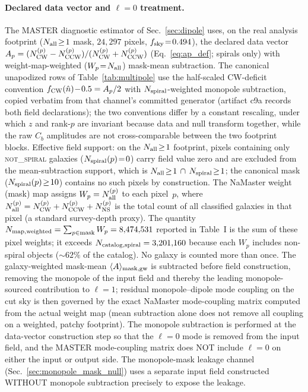 \documentclass[aps,prd,twocolumn,superscriptaddress,preprintnumbers,nofootinbib,longbibliography,floatfix]{revtex4-2}
\newcommand{\NS}{\textsc{not\_spiral}}
\begin{document}
\paragraph{Declared data vector and $\ell\!=\!0$ treatment.}
The MASTER diagnostic estimator of Sec.~\ref{sec:dipole} uses, on the real analysis footprint ($N_{\rm all}\!\geq\!1$ mask, $24{,}297$ pixels, $f_{\rm sky}\!=\!0.494$), the declared data vector $A_p = (N_{\rm CW}^{(p)} - N_{\rm CCW}^{(p)})/(N_{\rm CW}^{(p)} + N_{\rm CCW}^{(p)})$ (Eq.~\ref{eq:ap_def}; spirals only) with weight-map-weighted ($W_p\!=\!N_{\rm all}$) mask-mean subtraction. The canonical unapodized rows of Table~\ref{tab:multipole} use the half-scaled CW-deficit convention $f_{\rm CW}(\hat n)\!-\!0.5 = A_p/2$ with $N_{\rm spiral}$-weighted monopole subtraction, copied verbatim from that channel's committed generator (artifact c9a records both field declarations); the two conventions differ by a constant rescaling, under which $z$ and rank-$p$ are invariant because data and null transform together, while the raw $C_b$ amplitudes are not cross-comparable between the two footprint blocks. Effective field support: on the $N_{\rm all}\!\geq\!1$ footprint, pixels containing only \NS{} galaxies ($N_{\rm spiral}(p)\!=\!0$) carry field value zero and are excluded from the mean-subtraction support, which is $N_{\rm all}\!\geq\!1 \,\cap\, N_{\rm spiral}\!\geq\!1$; the canonical mask ($N_{\rm spiral}(p)\!\geq\!10$) contains no such pixels by construction. The NaMaster weight (mask) map assigns $W_p = N_{\rm all}^{(p)}$ to each pixel~$p$, where $N_{\rm all}^{(p)} = N_{\rm CW}^{(p)} + N_{\rm CCW}^{(p)} + N_{\rm NS}^{(p)}$ is the total count of all classified galaxies in that pixel (a standard survey-depth proxy). The quantity $N_{\rm map, weighted} = \sum_{p \in \rm mask} W_p = 8{,}474{,}531$ reported in Table~I is the sum of these pixel weights; it exceeds $N_{\rm catalog, spiral} = 3{,}201{,}160$ because each $W_p$ includes non-spiral objects (${\sim}62\%$ of the catalog). No galaxy is counted more than once. The galaxy-weighted mask-mean $\langle A\rangle_{\rm mask, gw}$ is subtracted before field construction, removing the monopole of the input field and thereby the leading monopole-sourced contribution to $\ell\!=\!1$; residual monopole--dipole mode coupling on the cut sky is then governed by the exact NaMaster mode-coupling matrix computed from the actual weight map (mean subtraction alone does not remove all coupling on a weighted, patchy footprint). The monopole subtraction is performed at the data-vector construction step so that the $\ell\!=\!0$ mode is removed from the input field, and the MASTER mode-coupling matrix does NOT include $\ell\!=\!0$ on either the input or output side. The monopole-mask leakage channel (Sec.~\ref{sec:monopole_mask_null}) uses a separate input field constructed WITHOUT monopole subtraction precisely to expose the leakage.
\end{document}
